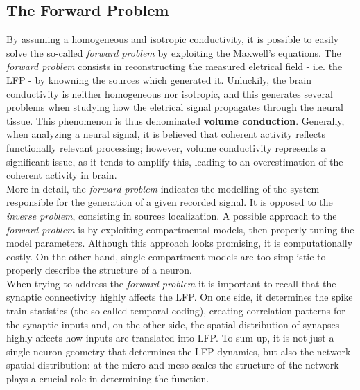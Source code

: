 \subsection{The Forward Problem}
By assuming a homogeneous and isotropic conductivity, it is possible to easily
solve the so-called \textit{forward problem} by exploiting the Maxwell's equations.
The \textit{forward problem} consists in reconstructing the measured eletrical field
- i.e. the LFP - by knowning the sources which generated it. Unluckily, the
brain conductivity is neither homogeneous nor isotropic, and this generates several
problems when studying how the eletrical signal propagates through the neural tissue.
This phenomenon is thus denominated \textbf{volume conduction}. Generally, when
analyzing a neural signal, it is believed that coherent activity reflects functionally
relevant processing; however, volume conductivity represents a significant issue, as
it tends to amplify this, leading to an overestimation of the coherent activity
in brain.\\
More in detail, the \textit{forward problem} indicates the modelling of the system
responsible for the generation of a given recorded signal. It is opposed to the
\textit{inverse problem}, consisting in sources localization. A possible approach
to the \textit{forward problem} is by exploiting compartmental models, then
properly tuning the model parameters. Although this approach looks promising,
it is computationally costly. On the other hand, single-compartment models
are too simplistic to properly describe the structure of a neuron.\\
When trying to address the \textit{forward problem} it is important to recall
that the synaptic connectivity highly affects the LFP. On one side, it
determines the spike train statistics (the so-called temporal coding), creating
correlation patterns for the synaptic inputs and, on the other side, the spatial
distribution of synapses highly affects how inputs are translated into LFP.
To sum up, it is not just a single neuron geometry that determines the LFP
dynamics, but also the network spatial distribution: at the micro and meso
scales the structure of the network plays a crucial role in determining
the function.

